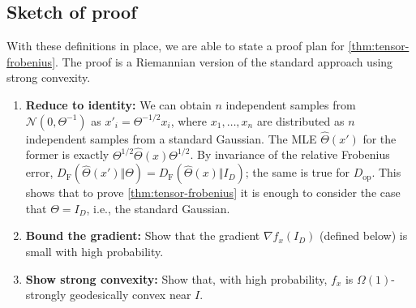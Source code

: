 \documentclass[aos]{imsart}
\theoremstyle{definition}
\numberwithin{equation}{section}
\renewcommand{\P}{{\mathbb{P}}}
\newcommand{\cN}{\mathcal{N}}
\newcommand{\samp}{x}
\newcommand{\DF}{D_{\operatorname{F}}}
\newcommand{\Dop}{D_{\operatorname{op}}}
\begin{document}
\subsection{Sketch of proof}\label{subsec:proof-sketch}







With these definitions in place, we are able to state a proof plan for \cref{thm:tensor-frobenius}. The proof is a Riemannian version of the standard approach using strong convexity.

\begin{enumerate}
\item\label{it:reduce}
\textbf{Reduce to identity:}
We can obtain $n$ independent samples from $\cN(0, \Theta^{-1})$ as $x'_i = \Theta^{-1/2} x_i$, where $x_1,\dots,x_n$ are distributed as $n$ independent samples from a standard Gaussian.
The MLE $\widehat{\Theta}(x')$ for the former is exactly $\Theta^{1/2} \widehat{\Theta}(x) \Theta^{1/2}$.
By invariance of the relative Frobenius error, $\DF(\widehat\Theta(x') \Vert \Theta) = \DF(\widehat\Theta(x) \Vert I_D)$; the same is true for $\Dop$.
This shows that to prove \cref{thm:tensor-frobenius} it is enough to consider the case that $\Theta = I_D$, i.e., the standard Gaussian.
\item\label{it:grad} \textbf{Bound the gradient:}
Show that the gradient $\nabla f_x(I_D)$ (defined below) is small with high probability.
\item\label{it:convexity} \textbf{Show strong convexity:}
Show that, with high probability, $f_x$ is $\Omega(1)$-strongly geodesically convex near $I$.
\end{enumerate}
\end{document}
